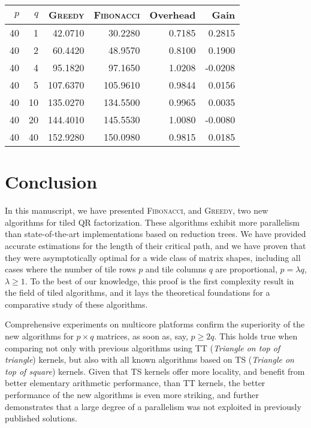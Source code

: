 \documentclass[a4paper,twopages]{article}
\newcommand{\MC}{\textsc{Fibonacci}\xspace}
\newcommand{\Greedy}{\textsc{Greedy}\xspace}
\begin{document}
\begin{table*}
    \centering
    \begin{tabular}{|r|r|r||r|r|r|}
         \hline
         $p$ &  $q$ & \Greedy &    \MC & Overhead &   Gain\\
         \hline
        40 &  1 &   42.0710 &  30.2280  &   0.7185 & 0.2815\\
        40 &  2 &   60.4420 &  48.9570  &   0.8100 & 0.1900\\
        40 &  4 &   95.1820 &  97.1650  &   1.0208 &-0.0208\\
        40 &  5 &  107.6370 & 105.9610  &   0.9844 & 0.0156\\
        40 & 10 &  135.0270 & 134.5500  &   0.9965 & 0.0035\\
        40 & 20 &  144.4010 & 145.5530  &   1.0080 &-0.0080\\
        40 & 40 &  152.9280 & 150.0980  &   0.9815 & 0.0185\\
         \hline
    \end{tabular}
    \caption{\Greedy versus \MC (Experimental Double Complex)}
\end{table*}





\section{Conclusion}
\label{sec.conclusion}

In this manuscript, we have presented \MC, and \Greedy, two new algorithms for tiled QR factorization.
These algorithms exhibit more parallelism than state-of-the-art implementations
based on reduction trees. We have provided accurate estimations for the length of their critical path,
and we have proven that they were asymptotically optimal for a wide class of matrix shapes, including
all cases where the number of tile rows $p$ and tile columns $q$ are proportional, $p = \lambda q$, $\lambda \geq 1$.
To the best of our knowledge, this proof is the first complexity result in the field of tiled algorithms,
and it lays the theoretical foundations for a comparative study of these algorithms.

Comprehensive experiments on multicore platforms confirm the superiority of the new algorithms for $p \times q$ matrices,
as soon as, say, $p \geq 2q$.
This holds true when comparing not only with previous algorithms using TT (\emph{Triangle on top of triangle}) kernels, but also
with all known algorithms based on TS (\emph{Triangle on top of square}) kernels. Given that TS kernels offer more locality, and
benefit from better elementary arithmetic performance, than TT kernels, the better performance of the new algorithms is
even more striking, and further demonstrates that a large degree of a parallelism was not exploited in previously published solutions.
\end{document}
